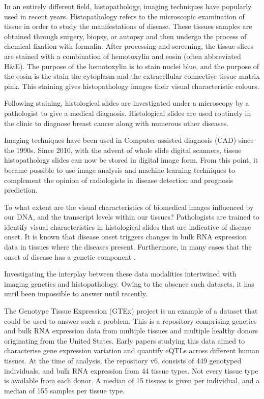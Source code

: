 \documentclass[graybox]{svmult}
\begin{document}
In an entirely different field, histopathology, imaging techniques have popularly used in recent years. Histopathology refers to the microscopic examination of tissue in order to study the manifestations of disease. These tissues samples are obtained through surgery, biopsy, or autopsy and then undergo the process of chemical fixation with formalin. After processing and screening, the tissue slices are stained with a combination of hemotoxylin and eosin \cite{hematoxylin-and-eosin-staining} (often abbreviated H\&E). The purpose of the hemotoxylin is to stain nuclei blue, and the purpose of the eosin is the stain the cytoplasm and the extracellular connective tissue matrix pink. This staining gives histopathology images their visual characteristic colours.

Following staining, histological slides are investigated under a microscopy by a pathologist to give a medical diagnosis. Histological slides are used routinely in the clinic to diagnose breast cancer along with numerous other diseases.

Imaging techniques have been used in Computer-assisted diagnosis (CAD) \cite{histopathological-image-analysis} since the 1990s. Since 2010, with the advent of whole slide digital scanners, tissue histopathology slides can now be stored in digital image form. From this point, it became possible to use image analysis and machine learning techniques to complement the opinion of radiologists in disease detection and prognosis prediction.

To what extent are the visual characteristics of biomedical images influenced by our DNA, and the transcript levels within our tissues? Pathologists are trained to identify visual characteristics in histological slides that are indicative of disease onset. It is known that disease onset triggers changes in bulk RNA expression data in tissues where the diseases present. \cite{gene-expression-parkinsons} Furthermore, in many cases that the onset of disease has a genetic component \cite{what-is-complex-about-complex-disorders}. 

Investigating the interplay between these data modalities intertwined with imaging genetics and histopathology. Owing to the absence such datasets, it has until been impossible to answer until recently.

The Genotype Tissue Expression (GTEx) project \cite{GTEx-project} is an example of a dataset that could be used to answer such a problem. This is a repository comprising genetics and bulk RNA expression data from multiple tissues and multiple healthy donors originating from the United States. Early papers studying this data aimed to characterise gene expression variation and quantify eQTLs across different human tissues. At the time of analysis, the repository v6, consists of 449 genotyped individuals, and bulk RNA expression from 44 tissue types. Not every tissue type is available from each donor. A median of 15 tissues is given per individual, and a median of 155 samples per tissue type.
\end{document}
